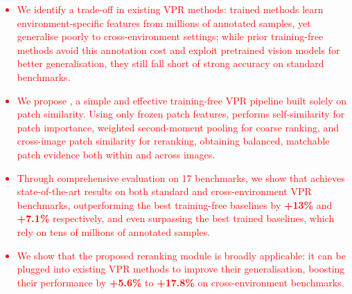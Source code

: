 \textcolor{red}{
\begin{itemize}
\item We identify a trade-off in existing VPR methods: trained methods learn environment-specific features from millions of annotated samples, yet generalise poorly to cross-environment settings; while prior training-free methods avoid this annotation cost and exploit pretrained vision models for better generalisation, they still fall short of strong accuracy on standard benchmarks.
\item We propose \method{}, a simple and effective training-free VPR pipeline built solely on patch similarity. Using only frozen patch features, \method{} performs self-similarity for patch importance, weighted second-moment pooling for coarse ranking, and cross-image patch similarity for reranking, obtaining balanced, matchable patch evidence both within and across images.
\item Through comprehensive evaluation on 17 benchmarks, we show that \method{} achieves state-of-the-art results on both standard and cross-environment VPR benchmarks, outperforming the best training-free baselines by \textbf{+13\%} and \textbf{+7.1\%} respectively, and even surpassing the best trained baselines, which rely on tens of millions of annotated samples.
\item We show that the proposed reranking module is broadly applicable: it can be plugged into existing VPR methods to improve their generalisation, boosting their performance by \textbf{+5.6\%} to \textbf{+17.8\%} on cross-environment benchmarks.
\end{itemize}
}